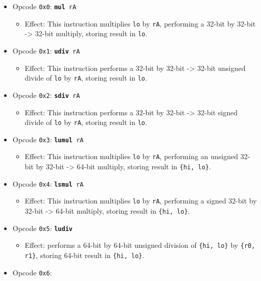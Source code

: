 \documentclass{article}
\begin{document}
	\singlespacing
	\begin{itemize}
		\item Opcode \texttt{0x0}:
			\texttt{\textbf{mul} rA}
		\begin{itemize}
			\item Effect:  This instruction multiplies \texttt{lo} by
			\texttt{rA}, performing a 32-bit by 32-bit -> 32-bit multiply,
			storing result in \texttt{lo}.
		\end{itemize}
		\item Opcode \texttt{0x1}:
			\texttt{\textbf{udiv} rA}
		\begin{itemize}
			\item Effect:  This instruction performs a 32-bit by 32-bit ->
			32-bit unsigned divide of \texttt{lo} by \texttt{rA}, storing
			result in \texttt{lo}.
		\end{itemize}
		\item Opcode \texttt{0x2}:
			\texttt{\textbf{sdiv} rA}
		\begin{itemize}
			\item Effect:  This instruction performs a 32-bit by 32-bit ->
			32-bit signed divide of \texttt{lo} by \texttt{rA}, storing
			result in \texttt{lo}.
		\end{itemize}
		\item Opcode \texttt{0x3}:
			\texttt{\textbf{lumul} rA}
		\begin{itemize}
			\item Effect:  This instruction multiplies \texttt{lo} by
			\texttt{rA}, performing an unsigned 32-bit by 32-bit -> 64-bit
			multiply, storing result in \texttt{\{hi, lo\}}.
		\end{itemize}
		\item Opcode \texttt{0x4}:
			\texttt{\textbf{lsmul} rA}
		\begin{itemize}
			\item Effect:  This instruction multiplies \texttt{lo} by
			\texttt{rA}, performing a signed 32-bit by 32-bit -> 64-bit
			multiply, storing result in \texttt{\{hi, lo\}}.
		\end{itemize}
		\item Opcode \texttt{0x5}:
			\texttt{\textbf{ludiv}}
		\begin{itemize}
			\item Effect:  performs a 64-bit by 64-bit unsigned division of
			\texttt{\{hi, lo\}} by \texttt{\{r0, r1\}}, storing 64-bit result in
			\texttt{\{hi, lo\}}.
		\end{itemize}
		\item Opcode \texttt{0x6}:

\end{itemize}
\end{document}
